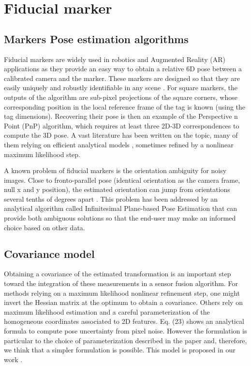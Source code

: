 %
%
\section{Fiducial marker}
\subsection{Markers Pose estimation algorithms}

Fiducial markers are widely used in robotics and Augmented Reality (AR) applications as they provide an easy way to obtain a relative 6D pose 
between a calibrated camera and the marker. These markers are designed so that they are easily uniquely and robustly identifiable in any scene 
\cite{wang2016iros,romero2018speeded}. For square markers, the outputs of the algorithm are sub-pixel projections of the square corners, whose 
corresponding position in the local reference frame of the tag is known (using the tag dimensions). Recovering their pose is then an example 
of the Perspective n Point (PnP) algorithm, which requires at least three 2D-3D correspondences to compute the 3D pose. 
A vast literature has been written on the topic, many of them relying on efficient analytical models
\cite{gao2003complete, lepetit2009epnp, collins2014infinitesimal, terzakis2020consistently}, sometimes refined by a nonlinear maximum likelihood step. 

A known problem of fiducial markers is the orientation ambiguity for noisy images. Close to fronto-parallel pose (identical orientation as 
the camera frame, null x and y position), the estimated orientation can jump from orientations several tenths of degrees apart \cite{collins2014infinitesimal}. 
This problem has been addressed by an analytical algorithm called Infinitesimal Plane-based Pose Estimation \cite{collins2014infinitesimal} that can 
provide both ambiguous solutions so that the end-user may make an informed choice based on other data.

\subsection{Covariance model}
Obtaining a covariance of the estimated transformation is an important step toward the integration of these measurements in a sensor fusion algorithm.
For methods relying on a maximum likelihood nonlinear refinement step, one might invert the Hessian matrix at the optimum to obtain a covariance.
Others \cite{urban2016mlpnp} rely on maximum likelihood estimation and a careful parameterization of the homogeneous coordinates associated to
2D features. Eq. (23) \cite{urban2016mlpnp} shows an analytical formula to compute pose uncertainty from pixel noise. However the formulation is 
particular to the choice of parameterization described in the paper and, therefore, we think that a simpler formulation is possible. This model is proposed 
in our work \cite{fourmy2019absolute}. 

